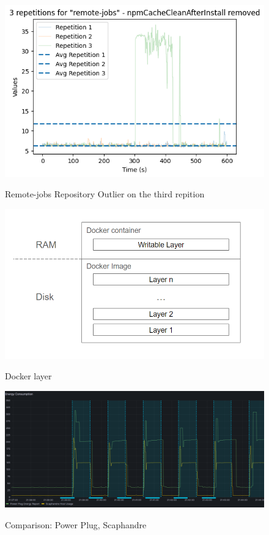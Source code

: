 \documentclass[conference]{IEEEtran}
\begin{document}



\newpage

\appendix

\begin{figure}[h]
    \centering
    \includegraphics[width=\linewidth]{graphics/remote_jobs_outlier.png}
    \caption{Remote-jobs Repository Outlier on the third repition}
    \textit{}
    \label{fig:remote-jobs-outlier}
\end{figure}

\begin{figure}[h]
    \centering
    \includegraphics[width=\linewidth]{graphics/docker_layer.png}
    \caption{Docker layer}
    \textit{}
    \label{fig:docker-layer}
\end{figure}


\begin{figure}[h]
    \centering
    \includegraphics[width=\linewidth]{graphics/scaph_vs_pp.png}
    \caption{Comparison: Power Plug, Scaphandre}
    \textit{}
    \label{fig:scaph-vs-pp}
\end{figure}
\end{document}
